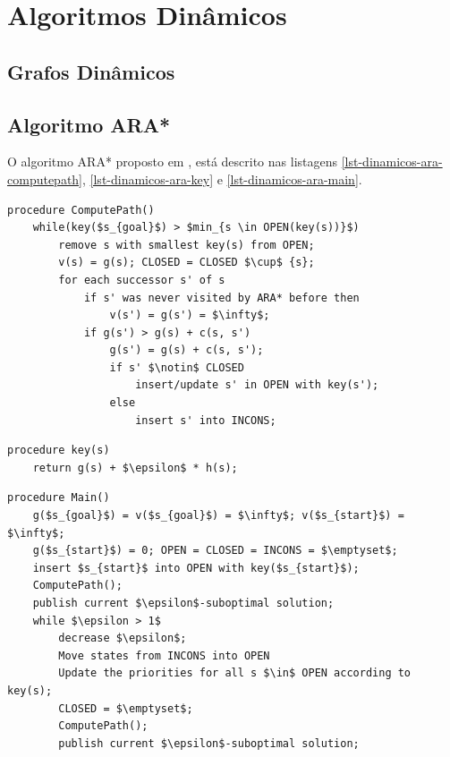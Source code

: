 \chapter{Algoritmos Dinâmicos}
\label{sec-dinamicos}

\section{Grafos Dinâmicos}
\label{sec-dinamicos-grafos}


\section{Algoritmo ARA*}
\label{sec-dinamicos-ara}

O algoritmo ARA* proposto em , está descrito nas listagens \ref{lst-dinamicos-ara-computepath}, \ref{lst-dinamicos-ara-key} e \ref{lst-dinamicos-ara-main}.

\begin{lstlisting}[mathescape, label=lst-dinamicos-ara-computepath, caption=Algoritmo ARA* - função de cálculo de caminho, float=htpb]
procedure ComputePath()
	while(key($s_{goal}$) > $min_{s \in OPEN(key(s))}$)
		remove s with smallest key(s) from OPEN;
		v(s) = g(s); CLOSED = CLOSED $\cup$ {s};
		for each successor s' of s
			if s' was never visited by ARA* before then
				v(s') = g(s') = $\infty$;
			if g(s') > g(s) + c(s, s')
				g(s') = g(s) + c(s, s');
				if s' $\notin$ CLOSED
					insert/update s' in OPEN with key(s');
				else
					insert s' into INCONS;
\end{lstlisting}

 
\begin{lstlisting}[mathescape, label=lst-dinamicos-ara-key, caption=Algoritmo ARA* - função da chave ordenadora da fila de prioridades, float=htpb]
procedure key(s)
	return g(s) + $\epsilon$ * h(s);
\end{lstlisting}

\begin{lstlisting}[mathescape, label=lst-dinamicos-ara-main, caption=Algoritmo ARA* - função principal, float=htpb]
procedure Main()
	g($s_{goal}$) = v($s_{goal}$) = $\infty$; v($s_{start}$) = $\infty$;
	g($s_{start}$) = 0; OPEN = CLOSED = INCONS = $\emptyset$;
	insert $s_{start}$ into OPEN with key($s_{start}$);
	ComputePath();
	publish current $\epsilon$-suboptimal solution;
	while $\epsilon > 1$
		decrease $\epsilon$;
		Move states from INCONS into OPEN
		Update the priorities for all s $\in$ OPEN according to key(s);
		CLOSED = $\emptyset$;
		ComputePath();
		publish current $\epsilon$-suboptimal solution;
\end{lstlisting}

